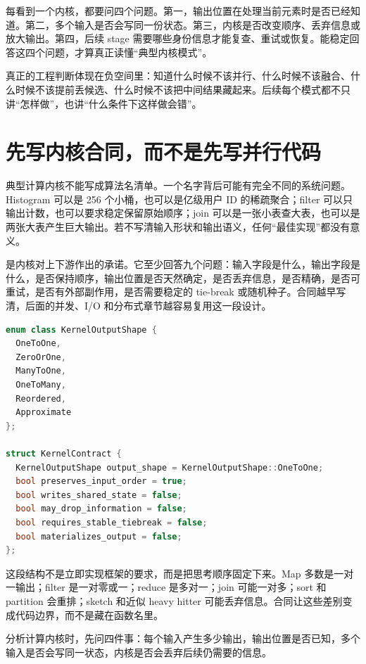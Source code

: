 每看到一个内核，都要问四个问题。第一，输出位置在处理当前元素时是否已经知道。第二，多个输入是否会写同一份状态。第三，内核是否改变顺序、丢弃信息或放大输出。第四，后续 stage 需要哪些身份信息才能复查、重试或恢复。能稳定回答这四个问题，才算真正读懂“典型内核模式”。

\begin{deepdive}
真正的工程判断体现在负空间里：知道什么时候不该并行、什么时候不该融合、什么时候不该提前丢候选、什么时候不该把中间结果藏起来。后续每个模式都不只讲“怎样做”，也讲“什么条件下这样做会错”。
\end{deepdive}

\section{先写内核合同，而不是先写并行代码}

典型计算内核不能写成算法名清单。一个名字背后可能有完全不同的系统问题。Histogram 可以是 256 个小桶，也可以是亿级用户 ID 的稀疏聚合；filter 可以只输出计数，也可以要求稳定保留原始顺序；join 可以是一张小表查大表，也可以是两张大表产生巨大输出。若不写清输入形状和输出语义，任何“最佳实现”都没有意义。

 是内核对上下游作出的承诺。它至少回答九个问题：输入字段是什么，输出字段是什么，是否保持顺序，输出位置是否天然确定，是否丢弃信息，是否精确，是否可重试，是否有外部副作用，是否需要稳定的 tie-break 或随机种子。合同越早写清，后面的并发、I/O 和分布式章节越容易复用这一段设计。

\begin{lstlisting}[language=C++,caption={KernelContract 的最小形态}]
enum class KernelOutputShape {
  OneToOne,
  ZeroOrOne,
  ManyToOne,
  OneToMany,
  Reordered,
  Approximate
};

struct KernelContract {
  KernelOutputShape output_shape = KernelOutputShape::OneToOne;
  bool preserves_input_order = true;
  bool writes_shared_state = false;
  bool may_drop_information = false;
  bool requires_stable_tiebreak = false;
  bool materializes_output = false;
};
\end{lstlisting}

这段结构不是立即实现框架的要求，而是把思考顺序固定下来。Map 多数是一对一输出；filter 是一对零或一；reduce 是多对一；join 可能一对多；sort 和 partition 会重排；sketch 和近似 heavy hitter 可能丢弃信息。合同让这些差别变成代码边界，而不是藏在函数名里。

\begin{keyidea}
分析计算内核时，先问四件事：每个输入产生多少输出，输出位置是否已知，多个输入是否会写同一状态，内核是否会丢弃后续仍需要的信息。
\end{keyidea}

